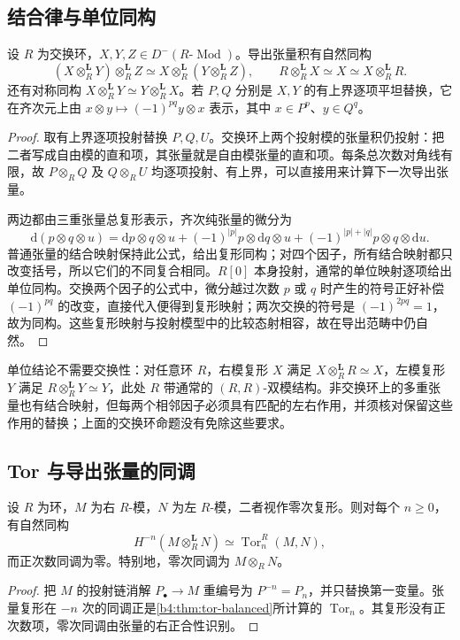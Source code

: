 \subsection{结合律与单位同构}
\label{b4:subsec:1802:02}

\begin{proposition}\label{b4:prop:derived-tensor-associativity}
	设 \(R\) 为交换环，\(X,Y,Z\in D^-(R\text{-}\operatorname{Mod})\)。导出张量积有自然同构
	\[
		(X\otimes_R^{\mathbf L}Y)\otimes_R^{\mathbf L}Z \simeq X\otimes_R^{\mathbf L}(Y\otimes_R^{\mathbf L}Z), \qquad R\otimes_R^{\mathbf L}X\simeq X\simeq X\otimes_R^{\mathbf L}R.
	\]
	还有对称同构 \(X\otimes_R^{\mathbf L}Y\simeq Y\otimes_R^{\mathbf L}X\)。若 \(P,Q\) 分别是 \(X,Y\) 的有上界逐项平坦替换，它在齐次元上由 \(x\otimes y\mapsto(-1)^{pq}y\otimes x\) 表示，其中 \(x\in P^p\)、\(y\in Q^q\)。
\end{proposition}
\begin{proof}
	取有上界逐项投射替换 \(P,Q,U\)。交换环上两个投射模的张量积仍投射：把二者写成自由模的直和项，其张量就是自由模张量的直和项。每条总次数对角线有限，故 \(P\otimes_RQ\) 及 \(Q\otimes_RU\) 均逐项投射、有上界，可以直接用来计算下一次导出张量。

	两边都由三重张量总复形表示，齐次纯张量的微分为
	\[
		\mathrm{d}(p\otimes q\otimes u)=\mathrm{d}p\otimes q\otimes u +(-1)^{|p|}p\otimes \mathrm{d}q\otimes u +(-1)^{|p|+|q|}p\otimes q\otimes \mathrm{d}u.
	\]
	普通张量的结合映射保持此公式，给出复形同构；对四个因子，所有结合映射都只改变括号，所以它们的不同复合相同。\(R[0]\) 本身投射，通常的单位映射逐项给出单位同构。交换两个因子的公式中，微分越过次数 \(p\) 或 \(q\) 时产生的符号正好补偿 \((-1)^{pq}\) 的改变，直接代入便得到复形映射；两次交换的符号是 \((-1)^{2pq}=1\)，故为同构。这些复形映射与投射模型中的比较态射相容，故在导出范畴中仍自然。
\end{proof}

单位结论不需要交换性：对任意环 \(R\)，右模复形 \(X\) 满足 \(X\otimes_R^{\mathbf L}R\simeq X\)，左模复形 \(Y\) 满足 \(R\otimes_R^{\mathbf L}Y\simeq Y\)，此处 \(R\) 带通常的 \((R,R)\)-双模结构。非交换环上的多重张量也有结合映射，但每两个相邻因子必须具有匹配的左右作用，并须核对保留这些作用的替换；上面的交换环命题没有免除这些要求。

\subsection{Tor 与导出张量的同调}
\label{b4:subsec:1802:03}

\begin{corollary}\label{b4:cor:tor-derived-tensor}
	设 \(R\) 为环，\(M\) 为右 \(R\)-模，\(N\) 为左 \(R\)-模，二者视作零次复形。则对每个 \(n\ge0\)，有自然同构
	\[
		H^{-n}(M\otimes_R^{\mathbf L}N)\simeq\operatorname{Tor}_n^R(M,N),
	\]
	而正次数同调为零。特别地，零次同调为 \(M\otimes_RN\)。
\end{corollary}
\begin{proof}
	把 \(M\) 的投射链消解 \(P_\bullet\to M\) 重编号为 \(P^{-n}=P_n\)，并只替换第一变量。张量复形在 \(-n\) 次的同调正是\cref{b4:thm:tor-balanced}所计算的 \(\operatorname{Tor}_n\)。其复形没有正次数项，零次同调由张量的右正合性识别。
\end{proof}

